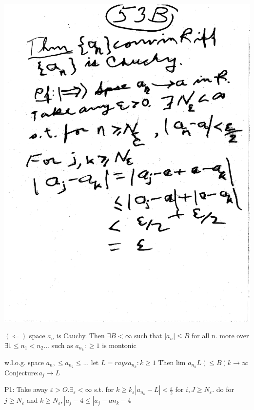 \documentclass[10pt,a4paper]{article}
\begin{document}
{{\includegraphics[scale=.5]{Pages/LC_12}

\newpage
$(\Leftarrow)$ space ${a_n}$ is Cauchy.
Then $\exists B < \infty$ such that $|a_n| \leq B$ for all n. more over $\exists 1 \leq n_{1} < n_{2}...$ such as ${a_{n_{k}} :\geq 1}$ is montonic

 w.l.o.g. space $a_{n}, \leq a_{n_2} \leq...$ let $L= rays a_{n_{k}} : k \geq 1$ Then lim $a_{n_{k}}  L (\leq B) k\longrightarrow \infty$ 
Conjecture:$a_j \rightarrow L$

P1: Take away $\varepsilon > O. \exists_\varepsilon < \infty$ s.t. for $k \geq k_\varepsilon |a_{n_{k}} - L| < \frac{\varepsilon}{2}$ for $i,J \geq N_\varepsilon.$ do for $j \geq N_\varepsilon$ and $k \geq N_\varepsilon, |a_j - 4 \leq |a_j - a{n_{k}} - 4$ \\

}}
\end{document}
